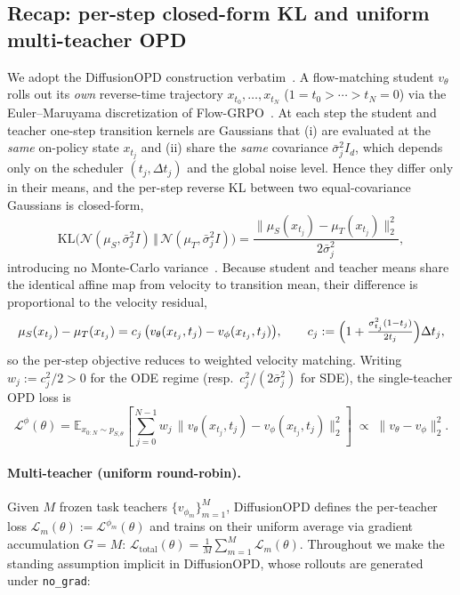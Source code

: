 \subsection{Recap: per-step closed-form KL and uniform multi-teacher OPD}
\label{sec:th-recap}

We adopt the DiffusionOPD construction verbatim~\cite{diffusionopd}. A flow-matching
student $v_\theta$ rolls out its \emph{own} reverse-time trajectory
$x_{t_0},\dots,x_{t_N}$ ($1{=}t_0{>}\cdots{>}t_N{=}0$) via the Euler--Maruyama
discretization of Flow-GRPO~\cite{liu2025flow}. At each step the student and teacher
one-step transition kernels are Gaussians that (i) are evaluated at the \emph{same}
on-policy state $x_{t_j}$ and (ii) share the \emph{same} covariance
$\bar\sigma_j^2 I_d$, which depends only on the scheduler $(t_j,\Delta t_j)$ and the
global noise level. Hence they differ only in their means, and the per-step reverse
KL between two equal-covariance Gaussians is closed-form,
\begin{equation}
\label{eq:th-gauss-kl}
\mathrm{KL}\!\bigl(\mathcal N(\mu_S,\bar\sigma_j^2 I)\,\Vert\,\mathcal N(\mu_T,\bar\sigma_j^2 I)\bigr)
=\frac{\|\mu_S(x_{t_j})-\mu_T(x_{t_j})\|_2^2}{2\bar\sigma_j^2},
\end{equation}
introducing no Monte-Carlo variance~\cite{diffusionopd}. Because student and teacher
means share the identical affine map from velocity to transition mean, their difference
is proportional to the velocity residual,
\begin{equation}
\label{eq:th-mean-vel}
\mu_S(x_{t_j})-\mu_T(x_{t_j}) = c_j\,\bigl(v_\theta(x_{t_j},t_j)-v_\phi(x_{t_j},t_j)\bigr),
\qquad
c_j := \Bigl(1+\tfrac{\sigma_{t_j}^2(1-t_j)}{2t_j}\Bigr)\Delta t_j,
\end{equation}
so the per-step objective reduces to weighted velocity matching. Writing
$w_j := c_j^2/2 > 0$ for the ODE regime (resp.\ $c_j^2/(2\bar\sigma_j^2)$ for SDE), the
single-teacher OPD loss is
\begin{equation}
\label{eq:th-single}
\mathcal L^\phi(\theta)
=\mathbb E_{x_{0:N}\sim p_{S,\theta}}\!\left[\sum_{j=0}^{N-1} w_j\,
\bigl\|v_\theta(x_{t_j},t_j)-v_\phi(x_{t_j},t_j)\bigr\|_2^2\right]
\;\propto\; \|v_\theta-v_\phi\|_2^2 .
\end{equation}

\paragraph{Multi-teacher (uniform round-robin).}
Given $M$ frozen task teachers $\{v_{\phi_m}\}_{m=1}^M$, DiffusionOPD defines the
per-teacher loss $\mathcal L_m(\theta):=\mathcal L^{\phi_m}(\theta)$ and trains on their
uniform average via gradient accumulation $G=M$:
$\mathcal L_{\mathrm{total}}(\theta)=\tfrac1M\sum_{m=1}^M \mathcal L_m(\theta)$.
Throughout we make the standing assumption implicit in DiffusionOPD, whose rollouts are
generated under \texttt{no\_grad}:

